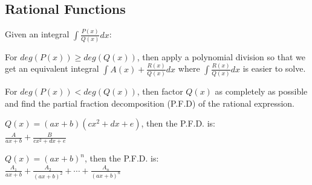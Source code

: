 \documentclass[8pt,a4paper]{extarticle}     %
\theoremstyle{definition}
\theoremstyle{definition}
\theoremstyle{definition}
\begin{document}
\begin{multicols}{4}
\subsection{Rational Functions}
Given an integral $\int \frac{P(x)}{Q(x)}dx$:
\begin{bulletlist}
	\item For $deg(P(x)) \geq deg(Q(x))$, then apply a polynomial division so that we get an equivalent integral $\int A(x) + \frac{R(x)}{Q(x)}dx$ where $\int \frac{R(x)}{Q(x)}dx$ is easier to solve.
	\item For $deg(P(x)) < deg(Q(x))$, then factor $Q(x)$ as completely as possible and find the partial fraction decomposition (P.F.D) of the rational expression.
	\begin{numberlist}
		\item $Q(x) = (ax+b)(cx^2+dx+e)$, then the P.F.D. is:\\ $\frac{A}{ax+b} + \frac{B}{cx^2+dx+e}$
		\item $Q(x) = (ax+b)^n $, then the P.F.D. is:\\ $ \frac{A_1}{ax+b}+\frac{A_2}{(ax+b)^2}+ \cdots + \frac{A_n}{(ax+b)^n}$
	\end{numberlist}
\end{bulletlist}


\end{multicols}
\end{document}
